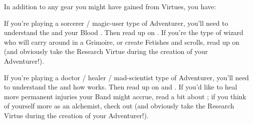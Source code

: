 \begin{multicols*}{2}
\newpage


    In addition to any gear you might have gained from Virtues, you have:





    If you're playing a sorcerer / magic-user type of Adventurer, you'll need to understand the  and your Blood \POOL. Then read up on . If you're the type of wizard who will carry  around in a Grimoire, or create Fetishes and scrolls, read up on  (and obviously take the Research Virtue during the creation of your Adventurer!).

\cbreak


    If you're playing a doctor / healer / mad-scientist type of Adventurer, you'll need to understand the  and how  works. Then read up on  and . If you'd like to heal more permanent injuries your Band might accrue, read a bit about ; if you think of yourself more as an alchemist, check out  (and obviously take the Research Virtue during the creation of your Adventurer!).


\end{multicols*}


